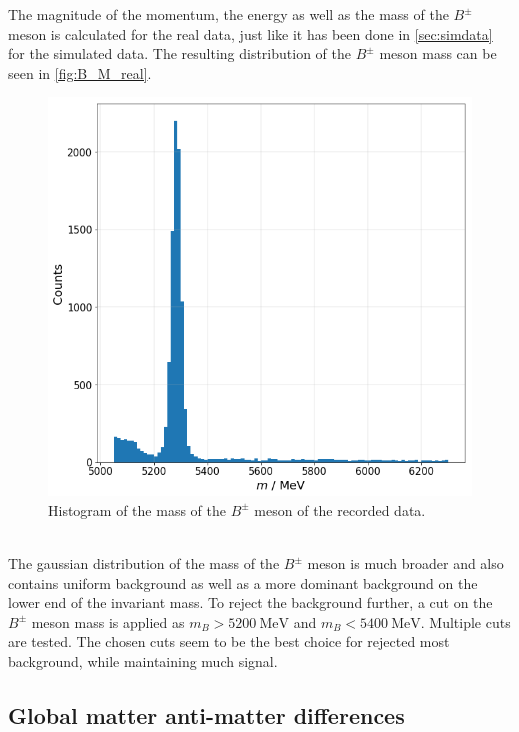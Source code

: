 The magnitude of the momentum, the energy as well as the mass of the $B^{\pm}$ meson is calculated for the real data, just like it has been done in \autoref{sec:simdata} for the simulated data.
The resulting distribution of the $B^{\pm}$ meson mass can be seen in \autoref{fig:B_M_real}.
\begin{figure}
  \centering
  \includegraphics[width = .5\textwidth]{"content/pics/B_M_real.png"}
  \caption{Histogram of the mass of the $B^{\pm}$ meson of the recorded data.}
  \label{fig:B_M_real}
\end{figure}
\\ The gaussian distribution of the mass of the $B^{\pm}$ meson is much broader and also contains uniform background as well as a more dominant background on the lower end of the invariant mass.
To reject the background further, a cut on the $B^{\pm}$ meson mass is applied as $m_B > \qty{5200}{\mega\electronvolt}$ and $m_B < \qty{5400}{\mega\electronvolt}$. Multiple 
cuts are tested. The chosen cuts seem to be the best choice for rejected most background, while maintaining much signal.\\

\subsection{Global matter anti-matter differences}

